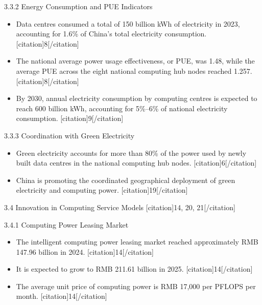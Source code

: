 \documentclass{huawei}
\begin{document}
\begin{tcolorbox}[
    title={Example of Hierarchical Research Outline},
    colback=gray!5,
    colframe=gray!40,
    fonttitle=\bfseries,
    boxrule=0.5pt,
    arc=2pt,
    breakable
]
\textcolor{TitleRed}{3.3.2 Energy Consumption and PUE Indicators}
\begin{itemize}[leftmargin=1em, listparindent=\parindent]
\item Data centres consumed a total of 150 billion kWh of electricity in 2023, accounting for 1.6\% of China’s total electricity consumption. [citation]8[/citation]
\item The national average power usage effectiveness, or PUE, was 1.48, while the average PUE across the eight national computing hub nodes reached 1.257. [citation]8[/citation]
\item By 2030, annual electricity consumption by computing centres is expected to reach 600 billion kWh, accounting for 5\%–6\% of national electricity consumption. [citation]9[/citation]
\end{itemize}

\textcolor{TitleRed}{3.3.3 Coordination with Green Electricity}
\begin{itemize}[leftmargin=1em, listparindent=\parindent]
\item Green electricity accounts for more than 80\% of the power used by newly built data centres in the national computing hub nodes. [citation]6[/citation]
\item China is promoting the coordinated geographical deployment of green electricity and computing power. [citation]19[/citation]
\end{itemize}

\textcolor{TitleRed}{3.4 Innovation in Computing Service Models [citation]14, 20, 21[/citation]}

\textcolor{TitleRed}{3.4.1 Computing Power Leasing Market}
\begin{itemize}[leftmargin=1em, listparindent=\parindent]
\item The intelligent computing power leasing market reached approximately RMB 147.96 billion in 2024. [citation]14[/citation]
\item It is expected to grow to RMB 211.61 billion in 2025. [citation]14[/citation]
\item The average unit price of computing power is RMB 17,000 per PFLOPS per month. [citation]14[/citation]
\end{itemize}


\end{tcolorbox}
\end{document}
